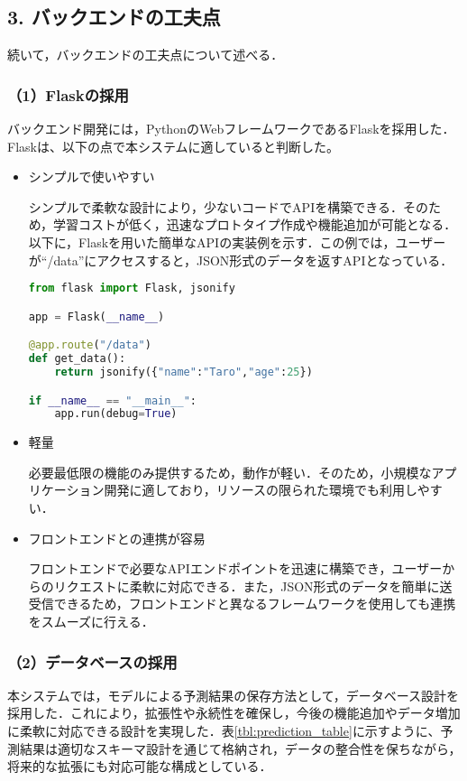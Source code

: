 \subsection*{3. バックエンドの工夫点}

続いて，バックエンドの工夫点について述べる．

\subsubsection*{（1）Flaskの採用}
バックエンド開発には，PythonのWebフレームワークであるFlaskを採用した．Flaskは、以下の点で本システムに適していると判断した。

\begin{itemize}
	\item シンプルで使いやすい
	
	シンプルで柔軟な設計により，少ないコードでAPIを構築できる．そのため，学習コストが低く，迅速なプロトタイプ作成や機能追加が可能となる．以下に，Flaskを用いた簡単なAPIの実装例を示す．この例では，ユーザーが``/data''にアクセスすると，JSON形式のデータを返すAPIとなっている．
\begin{lstlisting}[style=mystyle, language=Python, caption=Flaskによる簡単なAPIの実装例]
from flask import Flask, jsonify

app = Flask(__name__)

@app.route("/data")
def get_data():
	return jsonify({"name":"Taro","age":25})

if __name__ == "__main__":
	app.run(debug=True)
\end{lstlisting}
	
	\item 軽量
	
	必要最低限の機能のみ提供するため，動作が軽い．そのため，小規模なアプリケーション開発に適しており，リソースの限られた環境でも利用しやすい．

	\item フロントエンドとの連携が容易
	 
	フロントエンドで必要なAPIエンドポイントを迅速に構築でき，ユーザーからのリクエストに柔軟に対応できる．また，JSON形式のデータを簡単に送受信できるため，フロントエンドと異なるフレームワークを使用しても連携をスムーズに行える．
\end{itemize}

\subsubsection*{（2）データベースの採用}
本システムでは，モデルによる予測結果の保存方法として，データベース設計を採用した．これにより，拡張性や永続性を確保し，今後の機能追加やデータ増加に柔軟に対応できる設計を実現した．表\ref{tbl:prediction_table}に示すように、予測結果は適切なスキーマ設計を通じて格納され，データの整合性を保ちながら，将来的な拡張にも対応可能な構成としている．

